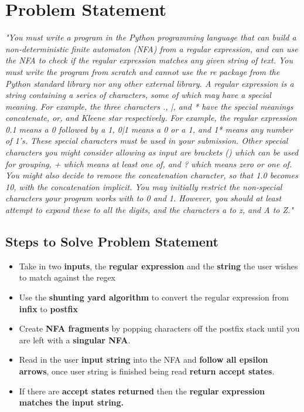 \documentclass[12pt]{article}
\begin{document}
\section{Problem Statement}
\cite{moodle}\cite{ianmcloughlin}\emph{"You must write a program in the Python\cite{python} programming language that can
build a non-deterministic finite automaton (NFA) from a regular expression,
and can use the NFA to check if the regular expression matches any given
string of text. You must write the program from scratch and cannot use the
re package from the Python standard library nor any other external library.
A regular expression is a string containing a series of characters, some of
which may have a special meaning. For example, the three characters ., |,
and * have the special meanings concatenate, or, and Kleene star respectively.
For example, the regular expression 0.1 means a 0 followed by a 1, 0|1 means
a 0 or a 1, and 1* means any number of 1’s. These special characters must
be used in your submission.
Other special characters you might consider allowing as input are brackets
() which can be used for grouping, + which means at least one of, and ? which
means zero or one of. You might also decide to remove the concatenation
character, so that 1.0 becomes 10, with the concatenation implicit. You may
initially restrict the non-special characters your program works with to 0 and
1. However, you should at least attempt to expand these to all the digits,
and the characters a to z, and A to Z."}

\subsection{Steps to Solve Problem Statement}
\begin{itemize}[noitemsep]
\item Take in two \textbf{inputs}, the \textbf{regular expression} and the \textbf{string} the user wishes to match against the regex
\item Use the \textbf{shunting yard algorithm} to convert the regular expression from \textbf{infix} to \textbf{postfix}
\item Create \textbf{NFA fragments} by popping characters off the postfix stack until you are left with a \textbf{singular NFA}.
\item Read in the user \textbf{input string} into the NFA and \textbf{follow all epsilon arrows}, once user string is finished being read \textbf{return accept states}.
\item If there are \textbf{accept states returned} then the \textbf{regular expression matches the input string.}
\end{itemize}
\end{document}
